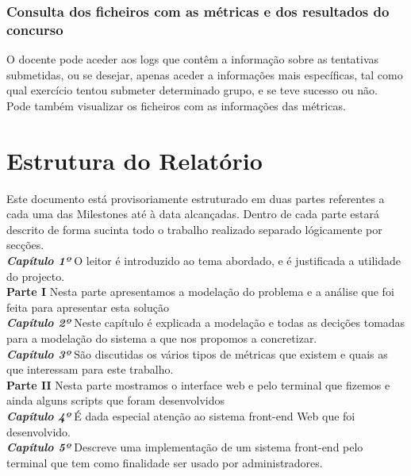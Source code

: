 \subsubsection{Consulta dos ficheiros com as métricas e dos resultados do concurso}
O docente pode aceder aos logs que contêm a informação sobre as tentativas submetidas, ou se desejar, apenas aceder a informações mais específicas, tal como 
qual exercício tentou submeter determinado grupo, e se teve sucesso ou não.\\
Pode também visualizar os ficheiros com as informações das métricas.

\section{Estrutura do Relatório}
Este documento está provisoriamente estruturado em duas partes referentes a cada uma das Milestones até à data alcançadas. Dentro de cada parte estará descrito de forma
sucinta todo o trabalho realizado separado lógicamente por secções.\\

\textbf{\textit{Capítulo 1º}} O leitor é introduzido ao tema abordado, e é justificada a utilidade do projecto.\\

\textbf{Parte I} Nesta parte apresentamos a modelação do problema e a análise que foi feita para apresentar esta solução\\

\textbf{\textit{Capítulo 2º}} Neste capítulo é explicada a modelação e todas as decições tomadas para a modelação do sistema a que nos propomos a concretizar.\\

\textbf{\textit{Capítulo 3º}} São discutidas os vários tipos de métricas que existem e quais as que interessam para este trabalho.\\

\textbf{Parte II} Nesta parte mostramos o interface web e pelo terminal que fizemos e ainda alguns scripts que foram desenvolvidos\\

\textbf{\textit{Capítulo 4º}} É dada especial atenção ao sistema front-end Web que foi desenvolvido.\\

\textbf{\textit{Capítulo 5º}} Descreve uma implementação de um sistema front-end pelo terminal que tem como finalidade ser usado por administradores.\\

